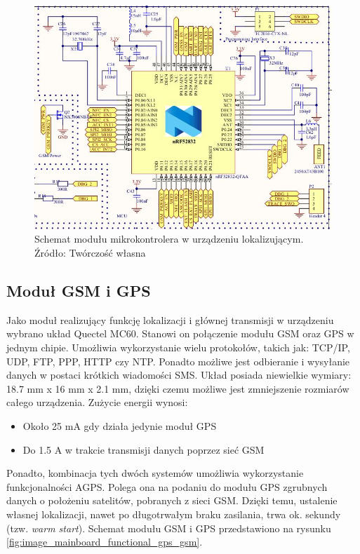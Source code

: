 \begin{figure}[H]
	\centering
	\includegraphics[width=15cm]{img/schematics/mainboard_functional_mcu.jpg}
	\caption{Schemat modułu mikrokontrolera w urządzeniu lokalizującym. \\ Źródło: Twórczość własna}
	\label{fig:image_mainboard_functional_mcu}
\end{figure}

\subsection{Moduł GSM i GPS}

Jako moduł realizujący funkcję lokalizacji i głównej transmisji w urządzeniu wybrano układ Quectel MC60. Stanowi on połączenie modułu GSM oraz GPS w jednym chipie. Umożliwia wykorzystanie wielu protokołów, takich jak: TCP/IP, UDP, FTP, PPP, HTTP czy NTP. Ponadto możliwe jest odbieranie i wysyłanie danych w postaci krótkich wiadomości SMS. Układ posiada niewielkie wymiary: 18.7 mm x 16 mm x 2.1 mm, dzięki czemu możliwe jest zmniejszenie rozmiarów całego urządzenia. Zużycie energii wynosi:
\begin{itemize}
\item Około 25 mA gdy działa jedynie moduł GPS
\item Do 1.5 A w trakcie transmisji danych poprzez sieć GSM
\end{itemize}

Ponadto, kombinacja tych dwóch systemów umożliwia wykorzystanie funkcjonalności AGPS. Polega ona na podaniu do modułu GPS zgrubnych danych o położeniu satelitów, pobranych z sieci GSM. Dzięki temu, ustalenie własnej lokalizacji, nawet po długotrwałym braku zasilania, trwa ok. sekundy (tzw. \textit{warm start}). Schemat modułu GSM i GPS przedstawiono na rysunku \ref{fig:image_mainboard_functional_gps_gsm}.

